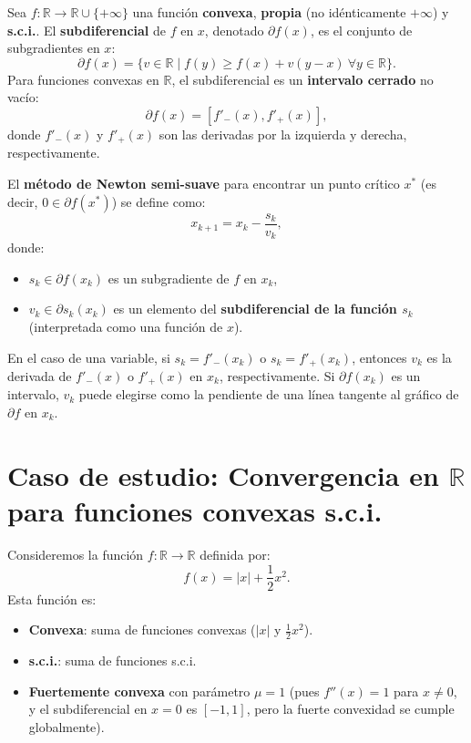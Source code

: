 \documentclass[12pt]{book}
\theoremstyle{definition}
\theoremstyle{plain}
\theoremstyle{remark}
\begin{document}
Sea \( f: \mathbb{R} \to \mathbb{R} \cup \{+\infty\} \) una función \textbf{convexa}, \textbf{propia} (no idénticamente \( +\infty \)) y \textbf{s.c.i.}. El \textbf{subdiferencial} de \( f \) en \( x \), denotado \( \partial f(x) \), es el conjunto de subgradientes en \( x \):
\[
\partial f(x) = \{ v \in \mathbb{R} \mid f(y) \geq f(x) + v(y - x) \ \forall y \in \mathbb{R} \}.
\]
Para funciones convexas en \( \mathbb{R} \), el subdiferencial es un \textbf{intervalo cerrado} no vacío:
\[
\partial f(x) = [f'_-(x), f'_+(x)],
\]
donde \( f'_-(x) \) y \( f'_+(x) \) son las derivadas por la izquierda y derecha, respectivamente.

\medskip
El \textbf{método de Newton semi-suave} para encontrar un punto crítico \( x^* \) (es decir, \( 0 \in \partial f(x^*) \)) se define como:
\[
x_{k+1} = x_k - \frac{s_k}{v_k},
\]
donde:
\begin{itemize}
    \item \( s_k \in \partial f(x_k) \) es un subgradiente de \( f \) en \( x_k \),
    \item \( v_k \in \partial s_k(x_k) \) es un elemento del \textbf{subdiferencial de la función \( s_k \)} (interpretada como una función de \( x \)).
\end{itemize}
En el caso de una variable, si \( s_k = f'_-(x_k) \) o \( s_k = f'_+(x_k) \), entonces \( v_k \) es la derivada de \( f'_-(x) \) o \( f'_+(x) \) en \( x_k \), respectivamente. Si \( \partial f(x_k) \) es un intervalo, \( v_k \) puede elegirse como la pendiente de una línea tangente al gráfico de \( \partial f \) en \( x_k \).

\section*{Caso de estudio: Convergencia en \( \mathbb{R} \) para funciones convexas s.c.i.}

Consideremos la función \( f: \mathbb{R} \to \mathbb{R} \) definida por:
\[
f(x) = |x| + \frac{1}{2} x^2.
\]
Esta función es:
\begin{itemize}
    \item \textbf{Convexa}: suma de funciones convexas (\( |x| \) y \( \frac{1}{2}x^2 \)).
    \item \textbf{s.c.i.}: suma de funciones s.c.i.
    \item \textbf{Fuertemente convexa} con parámetro \( \mu = 1 \) (pues \( f''(x) = 1 \) para \( x \neq 0 \), y el subdiferencial en \( x = 0 \) es \([-1, 1]\), pero la fuerte convexidad se cumple globalmente).
\end{itemize}
\end{document}
